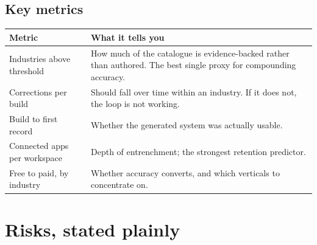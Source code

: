 \documentclass[11pt,a4paper]{article}
\begin{document}
\subsection{Key metrics}

\begin{center}
\begin{tabular}{@{}l p{8.4cm}@{}}
\toprule
\textbf{Metric} & \textbf{What it tells you} \\
\midrule
Industries above threshold   & How much of the catalogue is evidence-backed rather than authored.
                               The best single proxy for compounding accuracy. \\
Corrections per build        & Should fall over time within an industry. If it does not, the loop is
                               not working. \\
Build to first record        & Whether the generated system was actually usable. \\
Connected apps per workspace & Depth of entrenchment; the strongest retention predictor. \\
Free to paid, by industry    & Whether accuracy converts, and which verticals to concentrate on. \\
\bottomrule
\end{tabular}
\end{center}

\section{Risks, stated plainly}
\end{document}
